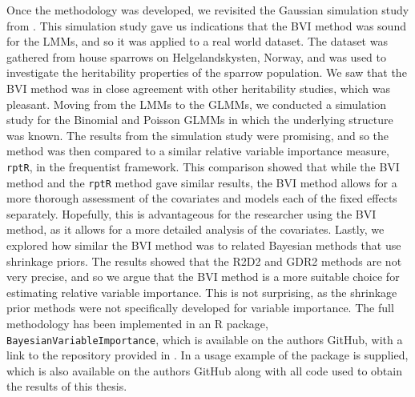 Once the methodology was developed, we revisited the Gaussian simulation study from \citet{Arnstad:Relative_variable_importance_in_Bayesian_linear_mixed_models:2024}. This simulation study gave us indications that the BVI method was sound for the LMMs, and so it was applied to a real world dataset. The dataset was gathered from house sparrows on Helgelandskysten, Norway, and was used to investigate the heritability properties of the sparrow population. We saw that the BVI method was in close agreement with other heritability studies, which was pleasant. Moving from the LMMs to the GLMMs, we conducted a simulation study for the Binomial and Poisson GLMMs in which the underlying structure was known. The results from the simulation study were promising, and so the method was then compared to a similar relative variable importance measure, \texttt{rptR}, in the frequentist framework. This comparison showed that while the BVI method and the \texttt{rptR} method gave similar results, the BVI method allows for a more thorough assessment of the covariates and models each of the fixed effects separately. Hopefully, this is advantageous for the researcher using the BVI method, as it allows for a more detailed analysis of the covariates. Lastly, we explored how similar the BVI method was to related Bayesian methods that use shrinkage priors. The results showed that the R2D2 and GDR2 methods are not very precise, and so we argue that the BVI method is a more suitable choice for estimating relative variable importance. This is not surprising, as the shrinkage prior methods were not specifically developed for variable importance. The full methodology has been implemented in an R package, \texttt{BayesianVariableImportance}, which is available on the authors GitHub, with a link to the repository provided in . In  a usage example of the package is supplied, which is also available on the authors GitHub along with all code used to obtain the results of this thesis.
\\
\\
